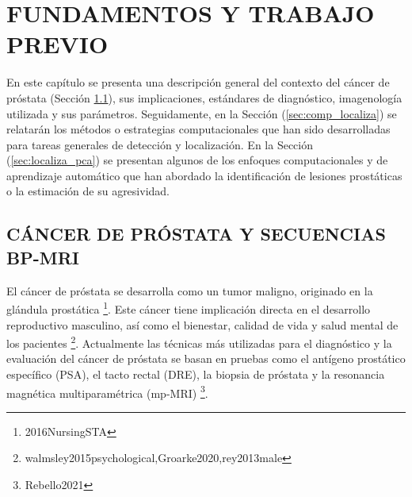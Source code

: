
\chapter{FUNDAMENTOS Y TRABAJO PREVIO}


En este capítulo se presenta una descripción general del contexto del cáncer de próstata  (Sección \ref{sec:diagnostico}), sus implicaciones, estándares de diagnóstico, imagenología utilizada y sus parámetros. Seguidamente, en la Sección (\ref{sec:comp_localiza}) se relatarán los métodos o estrategias computacionales que han sido desarrolladas para tareas generales de detección y localización. En la Sección (\ref{sec:localiza_pca}) se presentan algunos de los enfoques computacionales y de aprendizaje automático que han abordado la identificación de lesiones prostáticas o la estimación de su agresividad.

\section{CÁNCER DE PRÓSTATA Y SECUENCIAS BP-MRI} \label{sec:diagnostico}
El cáncer de próstata se desarrolla como un tumor maligno, originado en la glándula prostática \footnote{2016NursingSTA}. Este cáncer tiene implicación directa en el desarrollo reproductivo masculino, así como el bienestar, calidad de vida y salud mental de los pacientes \footnote{walmsley2015psychological,Groarke2020,rey2013male}. Actualmente las técnicas más utilizadas para el diagnóstico y la evaluación del cáncer de próstata se basan en pruebas como el antígeno prostático específico (PSA), el tacto rectal (DRE), la biopsia de próstata  y la resonancia magnética multiparamétrica (mp-MRI) \footnote{Rebello2021}.\par

